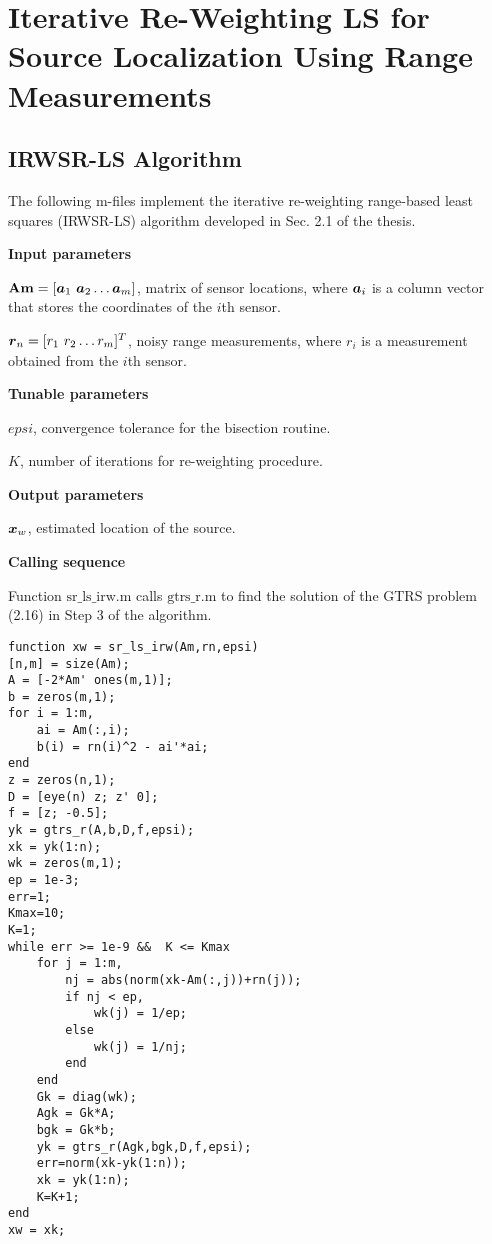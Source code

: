 \label{chapter:app2}


\section{Iterative Re-Weighting LS  for Source Localization Using Range Measurements}
\subsection{IRWSR-LS Algorithm}

The following m-files implement the iterative re-weighting range-based least squares (IRWSR-LS) algorithm developed in Sec. 2.1 of the thesis. 

\phantom{m}

\noindent
\textbf{Input parameters}

\noindent
$\mbox{\textbf{Am}} = [\mbox{\boldmath$a$}_1 \ \mbox{\boldmath$a$}_2 \ldots \mbox{\boldmath$a$}_m]$, matrix of sensor locations, where $\mbox{\boldmath$a$}_i$ is a column vector that stores the coordinates of the $i$th sensor.

\noindent
$\mbox{\boldmath$r$}_n = [r_1 \ r_2 \ldots r_m]^T$, noisy range measurements, where $r_i$ is a measurement obtained from the $i$th sensor.

\noindent
\textbf{Tunable parameters}

\noindent
$epsi$, convergence tolerance for the bisection routine.

\noindent
$K$, number of iterations for re-weighting procedure.

\noindent
\textbf{Output parameters}

\noindent
$\mbox{\boldmath$x$}_w$, estimated location of the source.

\noindent
\textbf{Calling sequence}

\noindent
Function $\mbox{sr\_ls\_irw.m}$ calls $\mbox{gtrs\_r.m}$ to find the solution of the GTRS problem (2.16) in Step 3 of the algorithm.

\phantom{m}

\begin{lstlisting}
function xw = sr_ls_irw(Am,rn,epsi)
[n,m] = size(Am);
A = [-2*Am' ones(m,1)];
b = zeros(m,1);
for i = 1:m,
    ai = Am(:,i);
    b(i) = rn(i)^2 - ai'*ai;
end
z = zeros(n,1);
D = [eye(n) z; z' 0];
f = [z; -0.5];
yk = gtrs_r(A,b,D,f,epsi);
xk = yk(1:n);
wk = zeros(m,1);
ep = 1e-3;
err=1;
Kmax=10; 
K=1;
while err >= 1e-9 &&  K <= Kmax 
    for j = 1:m,
        nj = abs(norm(xk-Am(:,j))+rn(j));
        if nj < ep,
            wk(j) = 1/ep;
        else
            wk(j) = 1/nj;
        end
    end
    Gk = diag(wk);
    Agk = Gk*A;
    bgk = Gk*b;
    yk = gtrs_r(Agk,bgk,D,f,epsi);
    err=norm(xk-yk(1:n));
    xk = yk(1:n);
    K=K+1;
end
xw = xk;
\end{lstlisting}

